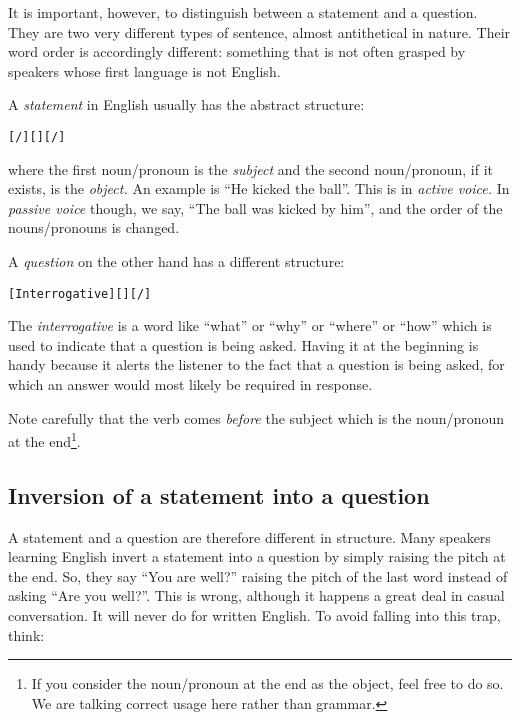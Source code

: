 \documentclass[
  11pt,
  british,
  a4paper,
]{article}
\begin{document}
It is important, however, to distinguish between a statement and a
question. They are two very different types of sentence, almost
antithetical in nature. Their word order is accordingly different:
something that is not often grasped by speakers whose first language is
not English.

A \emph{statement} in English usually has the abstract structure:

\begin{tcolorbox}
\begin{alltt}
\color{normal}
[/] [] [/]
\end{alltt}
\end{tcolorbox}

where the first noun/pronoun is the \emph{subject} and the second
noun/pronoun, if it exists, is the \emph{object.} An example is ``He
kicked the ball''. This is in \emph{active voice.} In \emph{passive
voice} though, we say, ``The ball was kicked by him'', and the order of
the nouns/pronouns is changed.

A \emph{question} on the other hand has a different structure:

\begin{tcolorbox}
\begin{alltt}
\color{normal}
[Interrogative] [] [/]
\end{alltt}
\end{tcolorbox}

The \emph{interrogative} is a word like ``what'' or ``why'' or ``where''
or ``how'' which is used to indicate that a question is being asked.
Having it at the beginning is handy because it alerts the listener to
the fact that a question is being asked, for which an answer would most
likely be required in response.

Note carefully that the verb comes \emph{before} the subject which is
the noun/pronoun at the end\footnote{If you consider the noun/pronoun at
  the end as the object, feel free to do so. We are talking correct
  usage here rather than grammar.}.

\hypertarget{inversion-of-a-statement-into-a-question}{%
\subsection{Inversion of a statement into a
question}\label{inversion-of-a-statement-into-a-question}}

A statement and a question are therefore different in structure. Many
speakers learning English invert a statement into a question by simply
raising the pitch at the end. So, they say ``You are well?'' raising the
pitch of the last word instead of asking ``Are you well?''. This is
wrong, although it happens a great deal in casual conversation. It will
never do for written English. To avoid falling into this trap, think:
\end{document}
